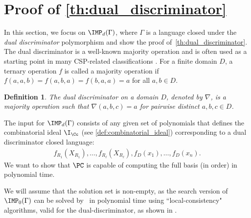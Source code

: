 \documentclass[11pt]{article}
\newtheorem{definition}[theorem]{Definition}
\begin{document}
\section{Proof of \cref{th:dual_discriminator}}\label{sect:dual-proof}
In this section, we focus on $\IMP_d(\Gamma)$, where $\Gamma$ is a language closed under the \emph{dual discriminator} polymorphism and show the proof of~\cref{th:dual_discriminator}. 
The dual discriminator is a well-known majority operation \cite{Jeavons:1997:CPC,barto_et_al:DFU:2017:6959} and is often used as a starting point in many CSP-related classifications \cite{barto_et_al:DFU:2017:6959}. For a finite domain $D$, a ternary operation $f$ is called a majority operation if  $f(a,a,b)=f(a,b,a)=f(b,a,a)=a$ for all $a,b\in D$. 
\begin{definition}\label{def:dual discriminator}
  The \emph{dual discriminator} on a domain $D$, denoted by $\nabla$, is a majority operation such that $\nabla(a,b,c)=a$ for pairwise distinct $a,b,c\in D$.
\end{definition}

The input for $\IMP_d(\Gamma)$ consists of any given set of polynomials that defines the combinatorial ideal $\I_\Cc$ (see \cref{def:combinatorial_ideal}) corresponding to a dual discriminator closed language: 
\begin{align}\label{eq:dual_generators}
    f_{R_1}(X_{R_1}),\ldots,f_{R_\ell}(X_{R_\ell}),f_D(x_1),\ldots,f_D(x_n).
\end{align}
We want to show that $\PC$ is capable of computing the full \GB basis (in \grlex order) in polynomial time.

We will assume that the solution set is non-empty, as the search version of $\IMP_0(\Gamma)$ can be solved by \PC\ in polynomial time using ``local-consistency" algorithms, valid for the dual-discriminator, as shown in \cite{JeffersonJGD13}.

\end{document}
